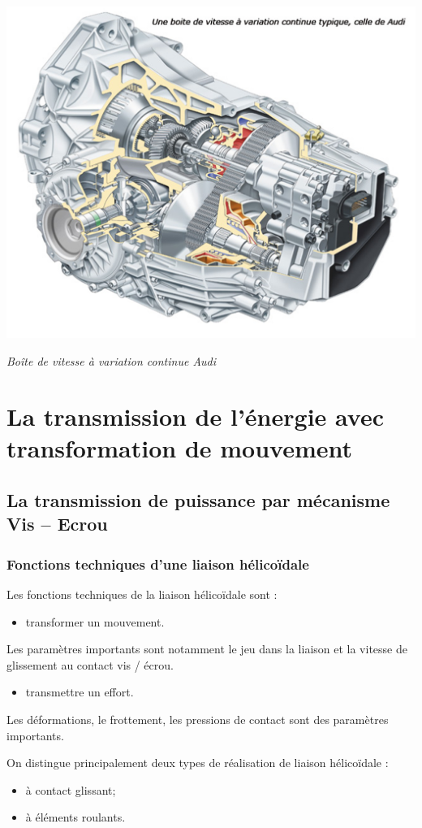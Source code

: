 \documentclass[11pt,oneside]{article}
\begin{document}
\begin{center}
\includegraphics[width=.7\textwidth]{png/fig_94}

\textit{Boîte de vitesse à variation continue Audi}

\end{center}


\section{La transmission de l’énergie avec transformation de mouvement}

\subsection{La transmission de puissance par mécanisme Vis -- Ecrou}

\subsubsection{Fonctions techniques d’une liaison hélicoïdale}

Les fonctions techniques de la liaison hélicoïdale sont :
\begin{itemize}
\item transformer un mouvement.
\end{itemize}
Les paramètres importants sont notamment le jeu dans la liaison et la vitesse de glissement au contact vis / écrou.
\begin{itemize}
\item transmettre un effort.
\end{itemize}

Les déformations, le frottement, les pressions de contact sont des paramètres importants.

On distingue principalement deux types de réalisation de liaison hélicoïdale :
\begin{itemize}
\item à contact glissant;
\item à éléments roulants.
\end{itemize}
\end{document}
